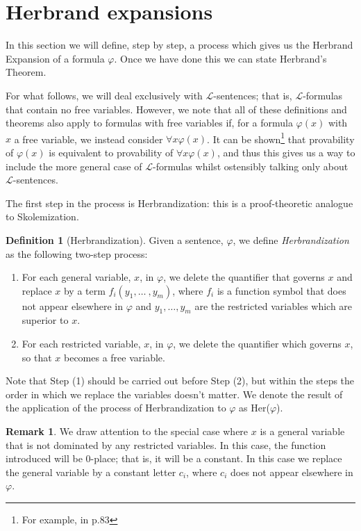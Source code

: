 \documentclass[a4paper,12pt]{report}
\theoremstyle{definition}
\newtheorem{mydef}[lem]{Definition}
\newtheorem{remark}[lem]{Remark}
\begin{document}
\section{Herbrand expansions}
\label{sec:expans}

In this section we will define, step by step, a process which gives us the Herbrand Expansion of a formula $\varphi$. Once we have done this we can state Herbrand's Theorem. 

For what follows, we will deal exclusively with $\mathcal{L}$-sentences; that is, $\mathcal{L}$-formulas that contain no free variables. However, we note that all of these definitions and theorems also apply to formulas with free variables if, for a formula $\varphi(x)$ with $x$ a free variable, we instead consider $\forall x \varphi(x)$. It can be shown\footnote{For example, in \cite{jhdiss} p.83} that provability of $\varphi(x)$ is equivalent to provability of $\forall x \varphi(x)$, and thus this gives us a way to include the more general case of $\mathcal{L}$-formulas whilst ostensibly talking only about $\mathcal{L}$-sentences.

The first step in the process is Herbrandization: this is a proof-theoretic analogue to Skolemization.

\begin{mydef}[Herbrandization]
\label{Herbranization}
Given a sentence, $\varphi$, we define \emph{Herbrandization} as the following two-step process:
\begin{enumerate}[(1)]
\item For each general variable, $x$, in $\varphi$, we delete the quantifier that governs $x$ and replace $x$ by a term $f_i(y_1, \ldots\ , y_m)$, where $f_i$ is a function symbol that does not appear elsewhere in $\varphi$ and $y_1, \ldots , y_m$ are the restricted variables which are superior to $x$.
\item For each restricted variable, $x$, in $\varphi$, we delete the quantifier which governs $x$, so that $x$ becomes a free variable.
\end{enumerate}
\noindent Note that Step (1) should be carried out before Step (2), but within the steps the order in which we replace the variables doesn't matter. We denote the result of the application of the process of Herbrandization to $\varphi$ as Her($\varphi$). 
\end{mydef}

\begin{remark}
We draw attention to the special case where $x$ is a general variable that is not dominated by any restricted variables. In this case, the function introduced will be 0-place; that is, it will be a constant. In this case we replace the general variable by a constant letter $c_i$, where $c_i$ does not appear elsewhere in $\varphi$.
\end{remark}
\end{document}
